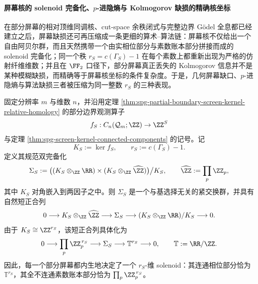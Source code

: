 \paragraph{屏幕核的 solenoid 完备化、\texorpdfstring{$p$}{p}-进隐熵与 Kolmogorov 缺损的精确核坐标}
在部分屏幕的相对顶维同调核、cut-space 余秩闭式与完整边界 Gödel 全息都已经建立之后，屏幕缺损还可再压缩成一条更细的算术--算法链：屏幕核不仅给出一个自由阿贝尔群，而且天然携带一个由实相位部分与素数账本部分拼接而成的 solenoid 完备化；同一个秩 \(r_S=c(\Gamma_S)-1\) 在每个素数上都重新出现为严格的仿射纤维维数；并且在 \(\FF_2\) 口径下，部分屏幕真正丢失的 Kolmogorov 信息并不是某种模糊缺损，而精确等于屏幕核坐标的条件复杂度。于是，几何屏幕缺口、\(p\)-进隐熵与算法缺损三者被压缩为同一整数 \(r_S\) 的三种表现。

\begin{theorem}\label{thm:conclusion-screen-kernel-solenoid-bicompletion}
固定分辨率 \(m\) 与维数 \(n\)，并沿用定理 \ref{thm:spg-partial-boundary-screen-kernel-relative-homology} 的部分边界观测算子
\[
f_S:C_n(\mathcal Q_m;\ZZ)\to \ZZ^S
\]
与定理 \ref{thm:spg-screen-kernel-connected-components} 的记号。记
\[
K_S:=\ker f_S,
\qquad
r_S:=c(\Gamma_S)-1.
\]
定义其规范双完备化
\[
\Sigma_S
:=
\bigl((K_S\otimes_{\ZZ}\RR)\times (K_S\otimes_{\ZZ}\widehat{\ZZ})\bigr)\big/K_S,
\qquad
\widehat{\ZZ}:=\prod_p \ZZ_p,
\]
其中 \(K_S\) 对角嵌入到两因子之中。则 \(\Sigma_S\) 是一个与基选择无关的紧交换群，并具有自然短正合列
\[
0\longrightarrow K_S\otimes_{\ZZ}\widehat{\ZZ}
\longrightarrow \Sigma_S
\longrightarrow (K_S\otimes_{\ZZ}\RR)/K_S
\longrightarrow 0.
\]
由于 \(K_S\cong \ZZ^{r_S}\)，该短正合列具体化为
\[
0\longrightarrow \prod_p \ZZ_p^{\,r_S}
\longrightarrow \Sigma_S
\longrightarrow \mathbb T^{r_S}
\longrightarrow 0,
\qquad
\mathbb T:=\RR/\ZZ.
\]
因此，每一个部分屏幕都内生地决定了一个 \(r_S\)-维 solenoid：其连通相位部分恰为 \(\mathbb T^{r_S}\)，其全不连通素数账本部分恰为 \(\prod_p\ZZ_p^{\,r_S}\)。
\end{theorem}

